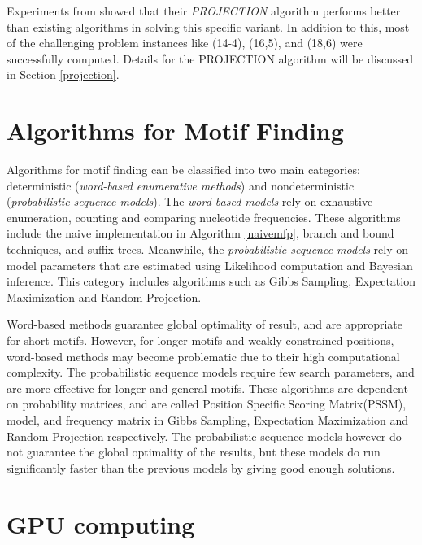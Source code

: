 \documentclass{llncs}
\begin{document}
{Experiments from \cite{tompa} showed that their \textit{PROJECTION} algorithm performs better than existing algorithms in solving this specific variant. In addition to this, most of the challenging problem instances like (14-4), (16,5), and (18,6)  were successfully computed. Details for the PROJECTION algorithm will be discussed in Section \ref{projection}.

\section{Algorithms for Motif Finding}\label{mfp_algorithms}
Algorithms for motif finding can be classified into two main categories: deterministic (\textit{word-based enumerative methods}) and nondeterministic (\textit{probabilistic sequence models}). The \textit{word-based models}  rely on exhaustive enumeration, counting and comparing nucleotide frequencies. These algorithms include the naive implementation in Algorithm \ref{naivemfp}, branch and bound techniques, and suffix trees. Meanwhile, the \textit{probabilistic sequence models} rely on model parameters that are estimated using Likelihood computation and Bayesian inference. This category includes algorithms such as Gibbs Sampling\cite{yu}, Expectation Maximization\cite{liu} and Random Projection\cite{tompa}.

Word-based methods guarantee global optimality of result, and are appropriate for short motifs. However, for longer motifs and weakly constrained positions, word-based methods may become problematic due to their high computational complexity. The probabilistic sequence models require few search parameters, and are more effective for longer and general motifs. These algorithms are  dependent on probability matrices, and are called  Position Specific Scoring Matrix(PSSM),  model, and frequency matrix in Gibbs Sampling, Expectation Maximization and Random Projection respectively. The probabilistic sequence models however do not guarantee the global optimality of the results, but these models do run significantly faster than the previous models by giving good enough solutions. 


\section{GPU computing}

}
\end{document}
